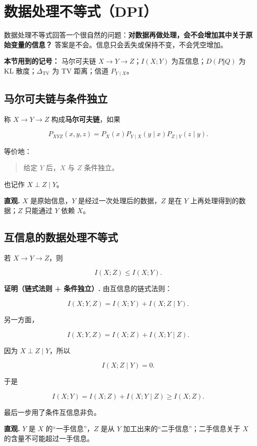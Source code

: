 \section{数据处理不等式（DPI）}


数据处理不等式回答一个很自然的问题：\textbf{对数据再做处理，会不会增加其中关于原始变量的信息？} 答案是不会。信息只会丢失或保持不变，不会凭空增加。

\textbf{本节用到的记号：} 马尔可夫链 $X\to Y\to Z$；$I(X;Y)$ 为互信息；$D(P\Vert Q)$ 为 KL 散度；$\Delta_{\mathrm{TV}}$ 为 TV 距离；信道 $P_{Y\mid X}$。

\subsection{马尔可夫链与条件独立}


称 $X\to Y\to Z$ 构成\textbf{马尔可夫链}，如果

\[
P_{XYZ}(x,y,z)
=P_X(x)P_{Y\mid X}(y\mid x)P_{Z\mid Y}(z\mid y).
\]

等价地：

\begin{quote}
给定 $Y$ 后，$X$ 与 $Z$ 条件独立。
\end{quote}


也记作 $X\perp Z\mid Y$。

\textbf{直观.} $X$ 是原始信息，$Y$ 是经过一次处理后的数据，$Z$ 是在 $Y$ 上再处理得到的数据；$Z$ 只能通过 $Y$ 依赖 $X$。

\subsection{互信息的数据处理不等式}


若 $X\to Y\to Z$，则

\[
\boxed{
I(X;Z)\le I(X;Y)
}.
\]

\textbf{证明（链式法则 + 条件独立）.} 由互信息的链式法则：

\[
I(X;Y,Z)=I(X;Y)+I(X;Z\mid Y).
\]

另一方面，

\[
I(X;Y,Z)=I(X;Z)+I(X;Y\mid Z).
\]

因为 $X\perp Z\mid Y$，所以

\[
I(X;Z\mid Y)=0.
\]

于是

\[
I(X;Y)=I(X;Z)+I(X;Y\mid Z)\ge I(X;Z).
\]

最后一步用了条件互信息非负。

\textbf{直观.} $Y$ 是 $X$ 的“一手信息”，$Z$ 是从 $Y$ 加工出来的“二手信息”；二手信息关于 $X$ 的含量不可能超过一手信息。


